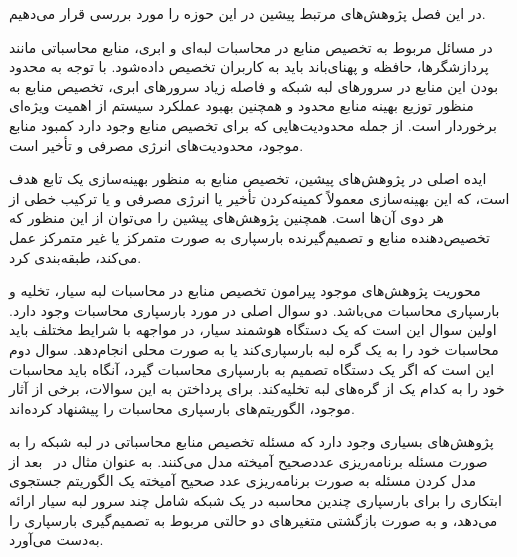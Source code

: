 

در این فصل پژوهش‌های مرتبط پیشین در این حوزه را مورد بررسی قرار می‌دهیم.


در مسائل مربوط به تخصیص منابع در محاسبات لبه‌ای و ابری، منابع محاسباتی مانند پردازشگرها، حافظه و پهنای‌باند باید به کاربران تخصیص داده‌شود. با توجه به محدود بودن این منابع در سرورهای لبه شبکه و فاصله زیاد سرورهای ابری، تخصیص منابع به منظور توزیع بهینه منابع محدود و همچنین بهبود عملکرد سیستم از اهمیت ویژه‌ای برخوردار است. از جمله محدودیت‌هایی که برای تخصیص منابع وجود دارد کمبود منابع موجود، محدودیت‌های انرژی مصرفی و تأخیر است.



ایده اصلی در پژوهش‌های پیشین، تخصیص منابع به منظور بهینه‌سازی یک تابع هدف است، که این بهینه‌سازی معمولاً کمینه‌کردن تأخیر یا انرژی مصرفی و یا ترکیب خطی از هر دوی آن‌ها است. همچنین پژوهش‌های پیشین را می‌توان از این منظور که تخصیص‌دهنده منابع و تصمیم‌گیرنده بارسپاری به صورت متمرکز یا غیر متمرکز  عمل می‌کند، طبقه‌بندی کرد.

محوریت پژوهش‌های موجود پیرامون تخصیص منابع در محاسبات لبه سیار، تخلیه و بارسپاری محاسبات می‌باشد. دو سوال اصلی در مورد بارسپاری محاسبات وجود دارد. اولین سوال این است که یک دستگاه هوشمند سیار، در مواجهه با شرایط مختلف باید محاسبات خود را به یک گره لبه بارسپاری‌کند یا به صورت محلی انجام‌دهد. سوال دوم این است که اگر یک دستگاه تصمیم به بارسپاری محاسبات گیرد، آنگاه باید محاسبات خود را به کدام یک از گره‌های لبه تخلیه‌کند. برای پرداختن به این سوالات، برخی از آثار موجود، الگوریتم‌های بارسپاری محاسبات را پیشنهاد کرده‌اند. 





پژوهش‌های بسیاری وجود دارد که مسئله تخصیص منابع محاسباتی در لبه شبکه را به صورت مسئله برنامه‌ریزی عددصحیح آمیخته مدل می‌کنند. به عنوان مثال در~\cite{tran2018joint} بعد از مدل کردن مسئله به صورت برنامه‌ریزی عدد صحیح آمیخته یک الگوریتم جستجوی ابتکاری را برای بارسپاری چندین محاسبه در یک شبکه شامل چند سرور لبه سیار ارائه می‌دهد، و به صورت بازگشتی متغیرهای دو حالتی مربوط به تصمیم‌گیری بارسپاری را به‌دست می‌آورد.

